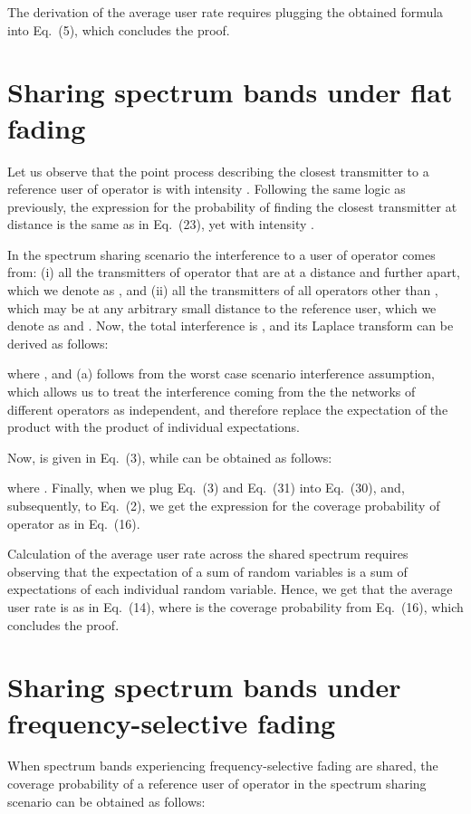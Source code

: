 \documentclass[12pt, journal,doublecolumn, final]{IEEEtran}
\begin{document}
The derivation of the average user rate requires plugging the obtained formula into Eq.~(5), which concludes the proof.

\section{Sharing spectrum bands under flat fading}
\label{app:spectrum_sharing}

Let us observe that the point process describing the closest transmitter to a reference user of operator  is  with intensity . Following the same logic as previously, the expression for the probability of finding the closest transmitter at distance  is the same as in Eq.~(23), yet with intensity .

In the spectrum sharing scenario the interference to a user of operator  comes from: (i) all the transmitters of operator  that are at a distance  and further apart, which we denote as , and (ii) all the transmitters of all operators other than , which may be at any arbitrary small distance to the reference user, which we denote as  and . Now, the total interference is , and its Laplace transform can be derived as follows:

where , and (a) follows from the worst case scenario interference assumption, which allows us to treat the interference coming from the the networks of different operators as independent, and therefore replace the expectation of the product with the product of individual expectations. 

Now,  is given in Eq.~(3), while  can be obtained as follows:

where . Finally, when we plug Eq.~(3) and Eq.~(31) into Eq.~(30), and, subsequently, to Eq.~(2), we get the expression for the coverage probability of operator  as in Eq.~(16).


Calculation of the average user rate across the shared spectrum requires observing that the expectation of a sum of random variables is a sum of expectations of each individual random variable. Hence, we get that the average user rate is as in Eq.~(14), where  is the coverage probability from Eq.~(16), which concludes the proof.

\section{Sharing spectrum bands under frequency-selective fading}
\label{app:spectrum_sharing_diversity}

When spectrum bands experiencing frequency-selective fading are shared, the coverage probability of a reference user of operator  in the spectrum sharing scenario can be obtained as follows:
\end{document}
